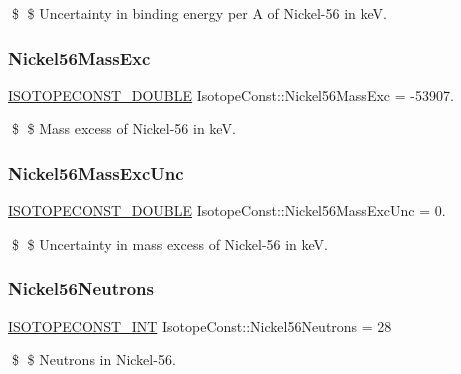\$ \$ Uncertainty in binding energy per A of Nickel-\/56 in keV. \mbox{\label{group___isotope_const-_nickel-_ni56_ga9233630710107fdd2ed850264b84744d}} 
\subsubsection{\texorpdfstring{Nickel56\+Mass\+Exc}{Nickel56MassExc}}
{\footnotesize\ttfamily \mbox{\hyperlink{group___isotope_const-_macros_ga8f45a7272ce02c0b4c65c44636ed719a}{I\+S\+O\+T\+O\+P\+E\+C\+O\+N\+S\+T\+\_\+\+D\+O\+U\+B\+LE}} Isotope\+Const\+::\+Nickel56\+Mass\+Exc = -\/53907.}

\$ \$ Mass excess of Nickel-\/56 in keV. \mbox{\label{group___isotope_const-_nickel-_ni56_gaa1d1e6a96163832109e7960f59ff431b}} 
\subsubsection{\texorpdfstring{Nickel56\+Mass\+Exc\+Unc}{Nickel56MassExcUnc}}
{\footnotesize\ttfamily \mbox{\hyperlink{group___isotope_const-_macros_ga8f45a7272ce02c0b4c65c44636ed719a}{I\+S\+O\+T\+O\+P\+E\+C\+O\+N\+S\+T\+\_\+\+D\+O\+U\+B\+LE}} Isotope\+Const\+::\+Nickel56\+Mass\+Exc\+Unc = 0.}

\$ \$ Uncertainty in mass excess of Nickel-\/56 in keV. \mbox{\label{group___isotope_const-_nickel-_ni56_gade188e6e8072db6b4d59d4369569ee26}} 
\subsubsection{\texorpdfstring{Nickel56\+Neutrons}{Nickel56Neutrons}}
{\footnotesize\ttfamily \mbox{\hyperlink{group___isotope_const-_macros_ga5f18360b3e99483a35c32d789e62621c}{I\+S\+O\+T\+O\+P\+E\+C\+O\+N\+S\+T\+\_\+\+I\+NT}} Isotope\+Const\+::\+Nickel56\+Neutrons = 28}

\$ \$ Neutrons in Nickel-\/56. \mbox{\label{group___isotope_const-_nickel-_ni56_gaf9044e755c97c9b79456b11ad7ef2b2f}} 
